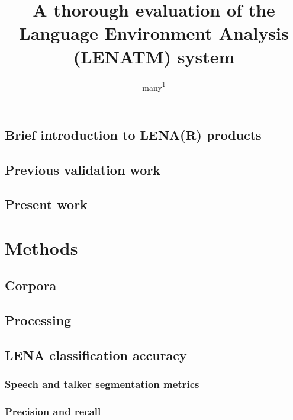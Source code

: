 \documentclass[english,floatsintext,man]{apa6}
\title{A thorough evaluation of the Language Environment Analysis (LENATM)
system}
\author{many\textsuperscript{1}}
\affiliation{
    \vspace{0.5cm}
          \textsuperscript{1}   }
\begin{document}
\maketitle

\setcounter{secnumdepth}{0}



\subsection{Brief introduction to LENA(R)
products}\label{brief-introduction-to-lenar-products}

\subsection{Previous validation work}\label{previous-validation-work}

\subsection{Present work}\label{present-work}

\section{Methods}\label{methods}

\subsection{Corpora}\label{corpora}

\subsection{Processing}\label{processing}

\subsection{LENA classification
accuracy}\label{lena-classification-accuracy}

\subsubsection{Speech and talker segmentation
metrics}\label{speech-and-talker-segmentation-metrics}

\subsubsection{Precision and recall}\label{precision-and-recall}
\end{document}
